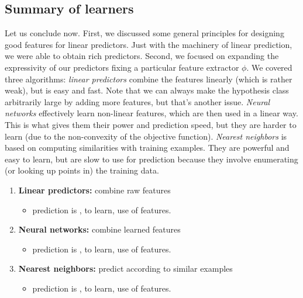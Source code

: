 \subsection{Summary of learners}
Let us conclude now.
%
First, we discussed some general principles for designing good features for linear predictors.
%
Just with the machinery of linear prediction, we were able to obtain rich predictors.
%
Second, we focused on expanding the expressivity of our predictors fixing a particular feature extractor $\phi$.
%
We covered three algorithms: \textit{linear predictors} combine the features linearly (which is rather weak), but is easy and fast.
%
Note that we can always make the hypothesis class arbitrarily large by adding more features, but that's another issue. %
%
\textit{Neural networks} effectively learn non-linear features, which are then used in a linear way.
%
This is what gives them their power and prediction speed, but they are harder to learn (due to the non-convexity of the objective function).
%
\textit{Nearest neighbors} is based on computing similarities with training examples.
%
They are powerful and easy to learn, but are slow to use for prediction because they involve enumerating (or looking up points in) the training data.
\begin{enumerate}
	\item \textbf{Linear predictors:} combine raw features
	\begin{itemize}
		\item prediction is \textbf{}, \textbf{} to learn, \textbf{} use of features.
	\end{itemize}

	\item \textbf{Neural networks:} combine learned features

	\begin{itemize}
		\item prediction is \textbf{}, \textbf{} to learn, \textbf{} use of features.
	\end{itemize}

	\item \textbf{Nearest neighbors:} predict according to similar examples
	\begin{itemize}
		\item prediction is \textbf{}, \textbf{} to learn, \textbf{} use of features.
	\end{itemize}
\end{enumerate}


